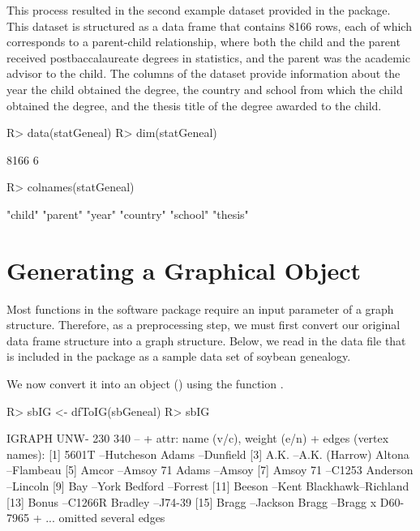 \documentclass[article,shortnames]{jss}
\begin{document}
This process resulted in the second example dataset provided in the  package. This dataset is structured as a data frame that contains 8166 rows, each of which corresponds to a parent-child relationship, where both the child and the parent received postbaccalaureate degrees in statistics, and the parent was the academic advisor to the child. The columns of the dataset provide information about the year the child obtained the degree, the country and school from which the child obtained the degree, and the thesis title of the degree awarded to the child.

\begin{CodeChunk}
\begin{CodeInput}
R> data(statGeneal)
R> dim(statGeneal)
\end{CodeInput}
\begin{CodeOutput}
[1] 8166    6
\end{CodeOutput}
\begin{CodeInput}
R> colnames(statGeneal)
\end{CodeInput}
\begin{CodeOutput}
[1] "child"   "parent"  "year"    "country" "school"  "thesis"
\end{CodeOutput}
\end{CodeChunk}

\section{Generating a Graphical Object}

Most functions in the software package require an input parameter of a graph structure. Therefore, as a preprocessing step, we must first convert our original data frame structure into a graph structure. Below, we read in the  data file  that is included in the package as a sample data set of soybean genealogy.


We now convert it into an  object (\citealt{igraph})  using the function .

\begin{CodeChunk}
\begin{CodeInput}
R> sbIG <- dfToIG(sbGeneal)
R> sbIG
\end{CodeInput}
\begin{CodeOutput}
IGRAPH UNW- 230 340 -- 
+ attr: name (v/c), weight (e/n)
+ edges (vertex names):
 [1] 5601T    --Hutcheson        Adams    --Dunfield        
 [3] A.K.     --A.K. (Harrow)    Altona   --Flambeau        
 [5] Amcor    --Amsoy 71         Adams    --Amsoy           
 [7] Amsoy 71 --C1253            Anderson --Lincoln         
 [9] Bay      --York             Bedford  --Forrest         
[11] Beeson   --Kent             Blackhawk--Richland        
[13] Bonus    --C1266R           Bradley  --J74-39          
[15] Bragg    --Jackson          Bragg    --Bragg x D60-7965
+ ... omitted several edges
\end{CodeOutput}
\end{CodeChunk}
\end{document}
